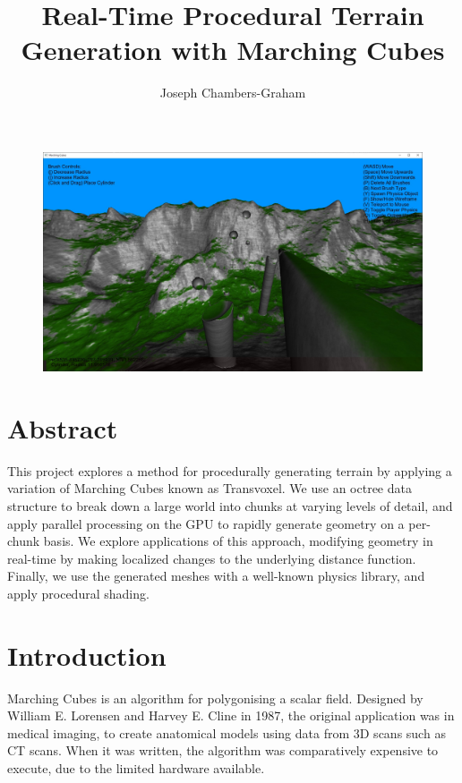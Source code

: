 \documentclass[11pt]{article}
\title{Real-Time Procedural Terrain Generation with Marching Cubes}
\author{Joseph Chambers-Graham}
\date{}
\begin{document}
% 


\maketitle
\begin{figure}[H]
  \includegraphics[width=\textwidth]{shaded_mountains.jpg}
\end{figure}
\newpage

\section*{Abstract}
This project explores a method for procedurally generating terrain by applying a variation of Marching Cubes known as Transvoxel. We use an octree data structure to break down a large world into chunks at varying levels of detail, and apply parallel processing on the GPU to rapidly generate geometry on a per-chunk basis. We explore applications of this approach, modifying geometry in real-time by making localized changes to the underlying distance function. Finally, we use the generated meshes with a well-known physics library, and apply procedural shading.
\newpage

\tableofcontents

\newpage
\section{Introduction}


Marching Cubes is an algorithm for polygonising a scalar field. Designed by William E. Lorensen and Harvey E. Cline in 1987\cite{10.1145/37402.37422}, the original application was in medical imaging, to create anatomical models using data from 3D scans such as CT scans. When it was written, the algorithm was comparatively expensive to execute, due to the limited hardware available. 
 
\end{document}

